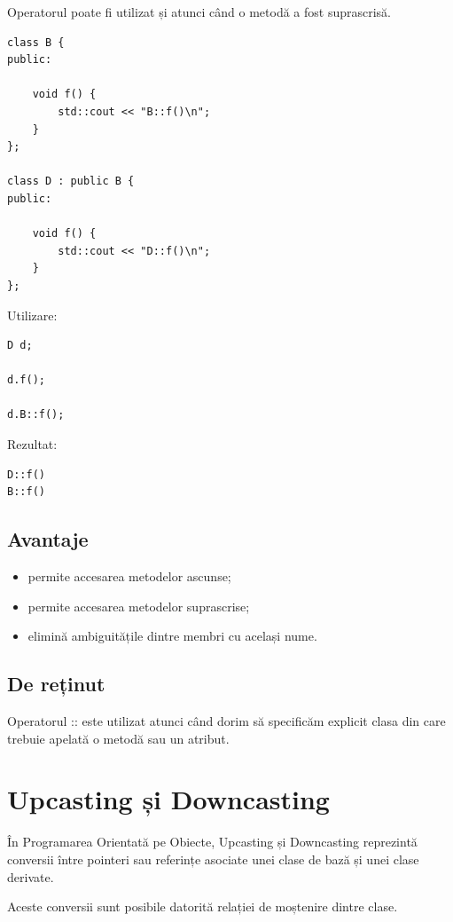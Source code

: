 \documentclass[12pt,a4paper]{article}
\begin{document}
Operatorul poate fi utilizat și atunci când o metodă a fost suprascrisă.

\begin{verbatim}
class B {
public:

    void f() {
        std::cout << "B::f()\n";
    }
};

class D : public B {
public:

    void f() {
        std::cout << "D::f()\n";
    }
};
\end{verbatim}

Utilizare:

\begin{verbatim}
D d;

d.f();

d.B::f();
\end{verbatim}

Rezultat:

\begin{verbatim}
D::f()
B::f()
\end{verbatim}

\subsection{Avantaje}

\begin{itemize}
\item permite accesarea metodelor ascunse;
\item permite accesarea metodelor suprascrise;
\item elimină ambiguitățile dintre membri cu același nume.
\end{itemize}

\subsection{De reținut}

Operatorul :: este utilizat atunci când dorim să specificăm explicit clasa din care trebuie apelată o metodă sau un atribut.




\section{Upcasting și Downcasting}

În Programarea Orientată pe Obiecte, Upcasting și Downcasting reprezintă conversii între pointeri sau referințe asociate unei clase de bază și unei clase derivate.

Aceste conversii sunt posibile datorită relației de moștenire dintre clase.
\end{document}
